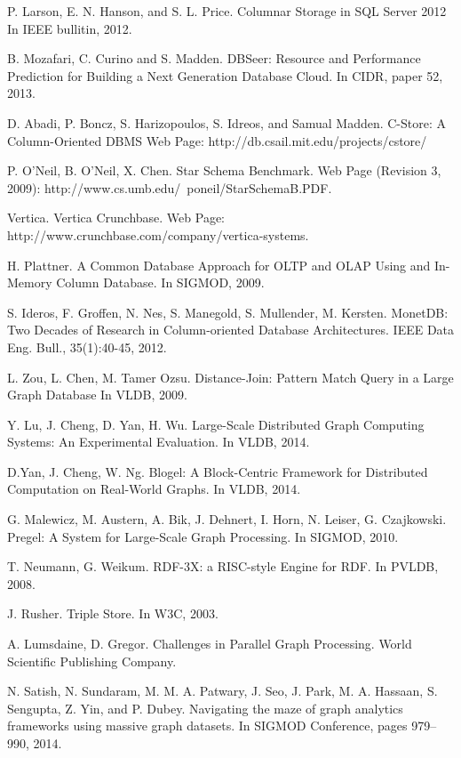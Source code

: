 \begin{thebibliography}{1}
P. Larson, E. N. Hanson, and S. L. Price.
Columnar Storage in SQL Server 2012
In IEEE bullitin, 2012.


B. Mozafari, C. Curino and S. Madden.
DBSeer: Resource and Performance Prediction for Building a Next Generation Database Cloud.
In CIDR, paper 52, 2013.

D. Abadi, P. Boncz, S. Harizopoulos, S. Idreos, and Samual Madden.
C-Store: A Column-Oriented DBMS
Web Page: http://db.csail.mit.edu/projects/cstore/


P. O'Neil, B. O'Neil, X. Chen.
Star Schema Benchmark.
Web Page (Revision 3, 2009): http://www.cs.umb.edu/~poneil/StarSchemaB.PDF.


Vertica.
Vertica Crunchbase.
Web Page: http://www.crunchbase.com/company/vertica-systems.


H. Plattner.
A Common Database Approach for OLTP and OLAP Using and In-Memory Column Database.
In SIGMOD, 2009.

S. Ideros, F. Groffen, N. Nes, S. Manegold, S. Mullender, M. Kersten.
MonetDB: Two Decades of Research in Column-oriented Database Architectures.
IEEE Data Eng. Bull., 35(1):40-45, 2012.


L. Zou, L. Chen, M. Tamer Ozsu.
Distance-Join: Pattern Match Query in a Large Graph Database
In VLDB, 2009.

Y. Lu, J. Cheng, D. Yan, H. Wu.
Large-Scale Distributed Graph Computing Systems: An Experimental Evaluation.
In VLDB, 2014.

D.Yan, J. Cheng, W. Ng.
Blogel: A Block-Centric Framework for Distributed Computation on Real-World Graphs.
In VLDB, 2014.

G. Malewicz, M. Austern, A. Bik, J. Dehnert, I. Horn, N. Leiser, G. Czajkowski.
Pregel: A System for Large-Scale Graph Processing.
In SIGMOD, 2010.

T. Neumann, G. Weikum.
RDF-3X: a RISC-style Engine for RDF.
In PVLDB, 2008.

J. Rusher.
Triple Store.
In W3C, 2003.

A. Lumsdaine, D. Gregor.
Challenges in Parallel Graph Processing.
World Scientific Publishing Company.

N. Satish, N. Sundaram, M. M. A. Patwary, J. Seo, J. Park, M. A. Hassaan, S. Sengupta, Z. Yin, and P. Dubey. Navigating the maze of graph analytics frameworks using massive graph datasets. 
In SIGMOD Conference, pages 979–990, 2014.


\end{thebibliography}
